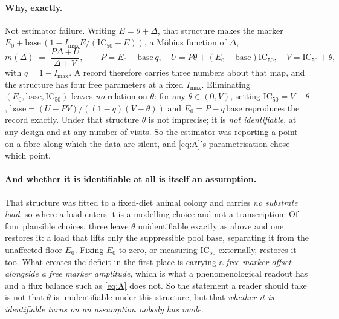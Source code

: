\begin{remark}
\paragraph{Why, exactly.} Not estimator failure. Writing $E = \theta + \Delta$, that
structure makes the marker $E_0 + \mathrm{base}\,(1 - I_{\max}E/(\mathrm{IC}_{50}+E))$,
a M\"obius function of $\Delta$,
\begin{equation}
m(\Delta) \;=\; \frac{P\Delta + U}{\Delta + V},
\qquad P = E_0 + \mathrm{base}\,q,\quad U = P\theta + (E_0+\mathrm{base})\mathrm{IC}_{50},
\quad V = \mathrm{IC}_{50} + \theta,
\label{eq:moebius}
\end{equation}
with $q = 1 - I_{\max}$. A record therefore carries three numbers about that map, and the
structure has four free parameters at a fixed $I_{\max}$. Eliminating
$(E_0, \mathrm{base}, \mathrm{IC}_{50})$ leaves \emph{no} relation on $\theta$: for any
$\theta \in (0,V)$, setting
$\mathrm{IC}_{50} = V-\theta$, $\mathrm{base} = (U-PV)/((1-q)(V-\theta))$ and
$E_0 = P - q\,\mathrm{base}$ reproduces the record exactly. Under that structure $\theta$
is not imprecise; it is \emph{not identifiable}, at any design and at any number of visits.
So the estimator was reporting a point on a fibre along which the data are silent, and
\eqref{eq:A}'s parametrisation chose which point.

\paragraph{And whether it is identifiable at all is itself an assumption.} That structure
was fitted to a fixed-diet animal colony and carries \emph{no substrate load}, so where a
load enters it is a modelling choice and not a transcription. Of four plausible choices,
three leave $\theta$ unidentifiable exactly as above and one restores it: a load that lifts
only the suppressible pool $\mathrm{base}$, separating it from the unaffected floor $E_0$.
Fixing $E_0$ to zero, or measuring $\mathrm{IC}_{50}$ externally, restores it too. What
creates the deficit in the first place is carrying a \emph{free marker offset alongside a
free marker amplitude}, which is what a phenomenological readout has and a flux balance such
as \eqref{eq:A} does not. So the statement a reader should take is not that $\theta$ is
unidentifiable under this structure, but that \emph{whether it is identifiable turns on an
assumption nobody has made}.


\end{remark}
